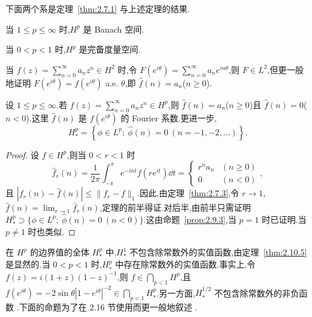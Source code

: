 下面两个系是定理~\ref{thm:2.7.1} 与上述定理的结果.

\begin{corollary}\label{cor:2.10.3}
当 $1 \leq p \leq \infty$ 时,$H^{p}$ 是 Banach 空间.
\end{corollary}

\begin{corollary}\label{cor:2.10.4}
当 $0 < p < 1$ 时,$H^{p}$ 是完备度量空间.
\end{corollary}

当 $f(z) = \sum_{n=0}^{\infty}a_{n}z^{n} \in H^{2}$ 时,令 $F(e^{i\theta}) = \sum_{n=0}^{\infty}a_{n}e^{in\theta}$,则 $F \in L^{2}$,但更一般地证明 $F(e^{i\theta}) = f(e^{i\theta})$ a.e. $\theta$,即 $\hat{f}(n) = a_{n}$($n \geq 0$).

\begin{theorem}\label{thm:2.10.5}
设 $1 \leq p \leq \infty$.若 $f(z) = \sum_{n=0}^{\infty}a_{n}z^{n} \in H^{p}$,则 $\hat{f}(n) = a_{n}$($n \geq 0$)且 $\hat{f}(n) = 0$($n < 0$).这里 $\hat{f}(n)$ 是 $f(e^{i\theta})$ 的 Fourier 系数.更进一步,
\begin{equation*}
H_{*}^{p} = \left\{\phi \in L^{p};\ \hat{\phi}(n) = 0 \ (n = -1, -2, \ldots)\right\}.
\end{equation*}
\end{theorem}

\begin{proof}
设 $f \in H^{p}$,则当 $0 < r < 1$ 时
\begin{equation*}
\hat{f}_{r}(n) = \frac{1}{2\pi}\int_{-\pi}^{\pi}e^{-int}f(re^{it})\dd t = \begin{cases} r^{n}a_{n} & (n \geq 0) \\ 0 & (n < 0) \end{cases},
\end{equation*}
且 $|\hat{f}_{r}(n) - \hat{f}(n)| \leq \|f_{r} - f\|_{1}$.因此,由定理~\ref{thm:2.7.3},令 $r \to 1$,$\hat{f}(n) = \lim_{r \to 1}\hat{f}_{r}(n)$,定理的前半得证.对后半,由前半只需证明 $H_{*}^{p} \supset \{\phi \in L^{p};\ \hat{\phi}(n) = 0 \ (n < 0)\}$.这由命题~\ref{prop:2.9.3},当 $p = 1$ 时已证明.当 $p \neq 1$ 时也类似.
\end{proof}

在 $H^{p}$ 的边界值的全体 $H_{*}^{p}$ 中,$H_{*}^{1}$ 不包含除常数外的实值函数,由定理~\ref{thm:2.10.5} 是显然的.当 $0 < p < 1$ 时,$H_{*}^{p}$ 中存在除常数外的实值函数.事实上,令 $f(z) = i(1 + z)(1 - z)^{-1}$,则 $f \in \bigcap_{p < 1}H^{p}$,且 $f(e^{i\theta}) = -2\sin\theta|1 - e^{i\theta}|^{-2} \in \bigcap_{p < 1}H_{*}^{p}$.另一方面,$H_{*}^{1/2}$ 不包含除常数外的非负函数 \cite{ch2:1}.下面的命题为了在 2.16 节使用而更一般地叙述 \cite{ch2:2}.

